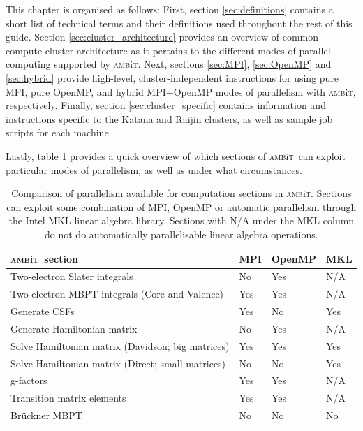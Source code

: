 \documentclass{report}
\newcommand{\ambit}{\textsc{amb}{\footnotesize i}\textsc{t}}
\begin{document}
This chapter is organised as follows:
First, section \ref{sec:definitions} contains a short list of technical terms and their definitions used
throughout the rest of this guide. Section \ref{sec:cluster_architecture} provides an overview of common
compute cluster architecture as it pertains to the different modes of parallel computing supported by
\ambit. Next, sections \ref{sec:MPI}, \ref{sec:OpenMP} and \ref{sec:hybrid} provide high-level,
cluster-independent instructions for using pure MPI, pure OpenMP, and hybrid MPI+OpenMP modes of 
parallelism with \ambit, respectively. Finally, section \ref{sec:cluster_specific} contains information
and instructions specific to the Katana and Raijin clusters, as well as sample job scripts for each
machine.

Lastly, table \ref{tab:parallelism} provides a quick overview of which sections of \ambit\ can exploit
particular modes of parallelism, as well as under what circumstances.


\begin{table}
\label{tab:parallelism}
\caption{Comparison of parallelism available for computation sections in \ambit. Sections can exploit
some combination of MPI, OpenMP or automatic parallelism through the Intel MKL linear algebra library.
Sections with N/A under the MKL column do not do automatically parallelisable linear algebra operations.}
\begin{tabular}{l l l l}
\hline
\ambit\ section & MPI   &OpenMP  &MKL\\
\hline
\hline
Two-electron Slater integrals   &No &Yes &N/A\\
Two-electron MBPT integrals (Core and Valence) &Yes    &Yes    &N/A\\
Generate CSFs   &Yes    &No &Yes\\
Generate Hamiltonian matrix     &No &Yes    &N/A\\
Solve Hamiltonian matrix (Davidson; big matrices) &Yes    &Yes    &Yes\\
Solve Hamiltonian matrix (Direct; small matrices)   &No &No &Yes\\
g-factors   &Yes    &Yes    &N/A\\
Transition matrix elements  &Yes    &Yes    &N/A\\
Br\"{u}ckner MBPT   &No &No &No\\
\hline
\end{tabular}
\end{table}
\end{document}

